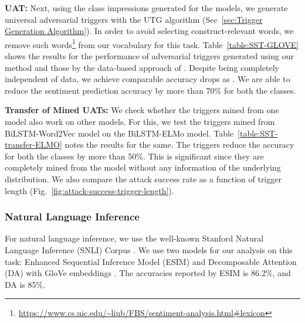 


\noindent\textbf{UAT:} Next, using the class impressions generated for the models, we generate universal adversarial triggers with the UTG algorithm (Sec~\ref{sec:Trigger Generation Algorithm}). In order to avoid selecting construct-relevant words, we remove such words\footnote{\url{https://www.cs.uic.edu/\~liub/FBS/sentiment-analysis.html\#lexicon}} from our vocabulary for this task. Table~\ref{table:SST-GLOVE} shows the results for the performance of adversarial triggers generated using our method and those by the data-based approach of \cite{wallace2019universal}. Despite being completely independent of data, we achieve comparable accuracy drops as \cite{wallace2019universal}. We are able to reduce the sentiment prediction accuracy by more than 70\% for both the classes.





\textbf{Transfer of Mined UATs:} We check whether the triggers mined from one model also work on other models. For this, we test the triggers mined from BiLSTM-Word2Vec model on the BiLSTM-ELMo model. Table~\ref{table:SST-transfer-ELMO} notes the results for the same. The triggers reduce the accuracy for both the classes by more than 50\%. This is significant since they are completely mined from the model without any information of the underlying distribution. We also compare the attack success rate as a function of trigger length (Fig.~\ref{fig:attack-success-trigger-length}).




\subsubsection{Natural Language Inference}
\label{sec:Natural Language Inference}
For natural language inference, we use the well-known Stanford Natural Language Inference (SNLI) Corpus \cite{bowman2015large}. We use two models for our analysis on this task: Enhanced Sequential Inference Model (ESIM) \cite{chen2016enhanced} and Decomposable Attention (DA) \cite{parikh2016decomposable} with GloVe embeddings \cite{pennington2014glove}. The accuracies reported by ESIM is 86.2\%, and DA is 85\%.


